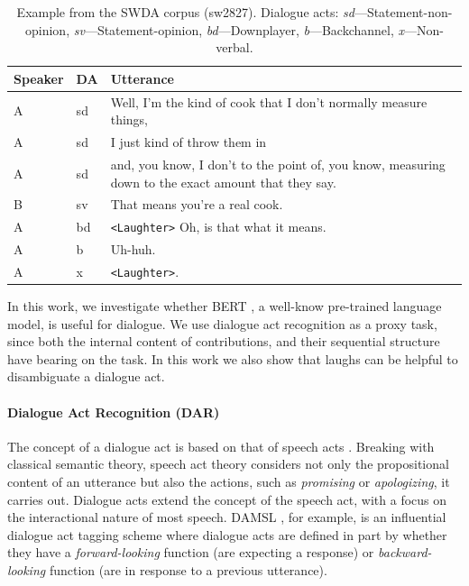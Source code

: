 \documentclass[11pt,a4paper]{article}
\begin{document}
\begin{table}
      \small
  \centering
  \begin{tabularx}{\linewidth}{llL}
    \toprule
    Speaker & DA & Utterance \\ \midrule
    A	&sd	& Well, I'm the kind of cook that I don't normally measure things,  \\
    A	&sd	& I just kind of throw them in \\
    A	&sd	& and, you know, I don't to the point of, you know, measuring down to the exact amount that they say.  \\
    B	&sv	& That means you're a real cook. \\
    A	&bd	& \texttt{<Laughter>} Oh, is that what it means.  \\
    A	&b	& Uh-huh.  \\
    A	&x	& \texttt{<Laughter>}.\\
             \bottomrule
  \end{tabularx}
  \caption{Example from the SWDA corpus (sw2827). Dialogue acts: \emph{sd}---Statement-non-opinion, \emph{sv}---Statement-opinion, \emph{bd}---Downplayer, \emph{b}---Backchannel, \emph{x}---Non-verbal. }
  \label{table:example}
\end{table}

In this work, we investigate whether BERT \citep{devlinBERTPretrainingDeep2018}, a well-know pre-trained language model, is useful for dialogue.
We use dialogue act recognition  as a proxy task, since both the internal content of contributions, and their sequential structure have bearing on the task.
In this work we also show that laughs can be helpful to disambiguate a dialogue act.


\paragraph{Dialogue Act Recognition (DAR)}
The concept of a dialogue act is based on that of speech acts \citep{austinHowThingsWords2009}.
Breaking with classical semantic theory, speech act theory considers not only the propositional content of an utterance but also the actions, such as \emph{promising} or \emph{apologizing}, it carries out.
Dialogue acts extend the concept of the speech act, with a focus on the interactional nature of most speech.
DAMSL \citep{coreCodingDialogsDAMSL1997}, for example, is an influential dialogue act tagging scheme where dialogue acts are defined in part by whether they have a \emph{forward-looking} function (are expecting a response) or \emph{backward-looking} function (are in response to a previous utterance).
\end{document}

